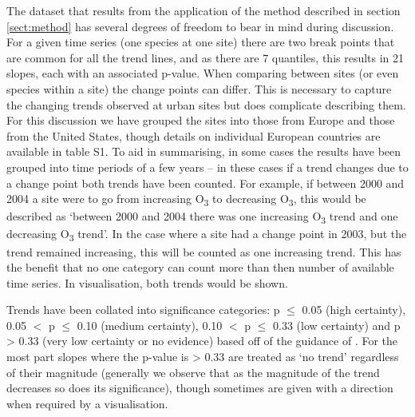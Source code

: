 \documentclass[journal abbreviation, manuscript]{copernicus}
\begin{document}
The dataset that results from the application of the method described in section \ref{sect:method} has several degrees of freedom to bear in mind during discussion. For a given time series (one species at one site) there are two break points that are common for all the trend lines, and as there are 7 quantiles, this results in 21 slopes, each with an associated p-value. When comparing between sites (or even species within a site) the change points can differ. This is necessary to capture the changing trends observed at urban sites but does complicate describing them. For this discussion we have grouped the sites into those from Europe and those from the United States, though details on individual European countries are available in table S1. 
To aid in summarising, in some cases the results have been grouped into time periods of a few years – in these cases if a trend changes due to a change point both trends have been counted. For example, if between 2000 and 2004 a site were to go from increasing O\textsubscript{3} to decreasing O\textsubscript{3}, this would be described as ‘between 2000 and 2004 there was one increasing O\textsubscript{3} trend and one decreasing O\textsubscript{3} trend’. In the case where a site had a change point in 2003, but the trend remained increasing, this will be counted as one increasing trend. This has the benefit that no one category can count more than then number of available time series. In visualisation, both trends would be shown.

Trends have been collated into significance categories: p $\le$ 0.05 (high certainty), 0.05 $<$ p $\le$ 0.10 (medium certainty), 0.10 $<$ p $\le$ 0.33 (low certainty) and p > 0.33 (very low certainty or no evidence) based off of the guidance of \cite{chang2023guidancenotebeststatistical}. For the most part slopes where the p-value is > 0.33 are treated as ‘no trend’ regardless of their magnitude (generally we observe that as the magnitude of the trend decreases so does its significance), though sometimes are given with a direction when required by a visualisation.
\end{document}
